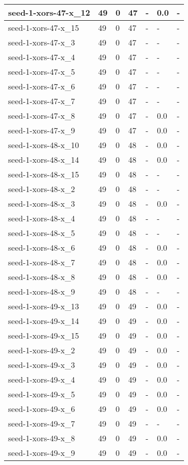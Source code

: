 \begin{scriptsize}
\begin{longtable}{|p{5cm}|l|l|l|l|l|l|}
seed-1-xors-47-x\_12&49&0&47&-&0.0&- \\ \hline 
seed-1-xors-47-x\_15&49&0&47&-&-&- \\ \hline 
seed-1-xors-47-x\_3&49&0&47&-&-&- \\ \hline 
seed-1-xors-47-x\_4&49&0&47&-&-&- \\ \hline 
seed-1-xors-47-x\_5&49&0&47&-&-&- \\ \hline 
seed-1-xors-47-x\_6&49&0&47&-&-&- \\ \hline 
seed-1-xors-47-x\_7&49&0&47&-&-&- \\ \hline 
seed-1-xors-47-x\_8&49&0&47&-&0.0&- \\ \hline 
seed-1-xors-47-x\_9&49&0&47&-&0.0&- \\ \hline 
seed-1-xors-48-x\_10&49&0&48&-&0.0&- \\ \hline 
seed-1-xors-48-x\_14&49&0&48&-&0.0&- \\ \hline 
seed-1-xors-48-x\_15&49&0&48&-&-&- \\ \hline 
seed-1-xors-48-x\_2&49&0&48&-&-&- \\ \hline 
seed-1-xors-48-x\_3&49&0&48&-&0.0&- \\ \hline 
seed-1-xors-48-x\_4&49&0&48&-&-&- \\ \hline 
seed-1-xors-48-x\_5&49&0&48&-&-&- \\ \hline 
seed-1-xors-48-x\_6&49&0&48&-&0.0&- \\ \hline 
seed-1-xors-48-x\_7&49&0&48&-&0.0&- \\ \hline 
seed-1-xors-48-x\_8&49&0&48&-&0.0&- \\ \hline 
seed-1-xors-48-x\_9&49&0&48&-&-&- \\ \hline 
seed-1-xors-49-x\_13&49&0&49&-&0.0&- \\ \hline 
seed-1-xors-49-x\_14&49&0&49&-&0.0&- \\ \hline 
seed-1-xors-49-x\_15&49&0&49&-&0.0&- \\ \hline 
seed-1-xors-49-x\_2&49&0&49&-&0.0&- \\ \hline 
seed-1-xors-49-x\_3&49&0&49&-&0.0&- \\ \hline 
seed-1-xors-49-x\_4&49&0&49&-&0.0&- \\ \hline 
seed-1-xors-49-x\_5&49&0&49&-&0.0&- \\ \hline 
seed-1-xors-49-x\_6&49&0&49&-&0.0&- \\ \hline 
seed-1-xors-49-x\_7&49&0&49&-&-&- \\ \hline 
seed-1-xors-49-x\_8&49&0&49&-&0.0&- \\ \hline 
seed-1-xors-49-x\_9&49&0&49&-&0.0&- \\ \hline 

\end{longtable}
\end{scriptsize}
